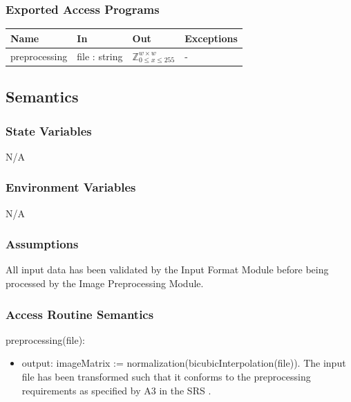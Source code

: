 \documentclass[12pt, titlepage]{article}
\begin{document}
\subsubsection{Exported Access Programs}

\begin{center}
\begin{tabular}{p{3cm} p{3cm} p{4cm} p{2cm}}
\hline
\textbf{Name} & \textbf{In} & \textbf{Out} & \textbf{Exceptions} \\
\hline
preprocessing & file : string & $\mathbb{Z}^{w \times w}_{0 \le x \le 255}$ & - \\
\hline
\end{tabular}
\end{center}

\subsection{Semantics}

\subsubsection{State Variables}

N/A

\subsubsection{Environment Variables}

N/A

\subsubsection{Assumptions}

All input data has been validated by the Input Format Module before being
processed by the Image Preprocessing Module.

\subsubsection{Access Routine Semantics}

\noindent preprocessing(file):
\begin{itemize} 
\item output: imageMatrix := normalization(bicubicInterpolation(file)). The
input file has been transformed such that it conforms to the preprocessing
requirements as specified by A3 in the SRS \citep[4.2.1]{SRS}.
\end{itemize}
\end{document}

